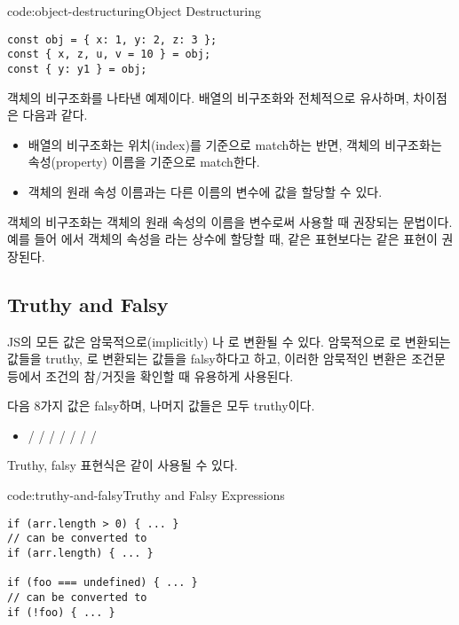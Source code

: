 \begin{codeenv}{code:object-destructuring}{Object Destructuring}\begin{verbatim}
const obj = { x: 1, y: 2, z: 3 };
const { x, z, u, v = 10 } = obj;
const { y: y1 } = obj;
\end{verbatim}
\end{codeenv}

\은 객체의 비구조화를 나타낸 예제이다. 배열의 비구조화와 전체적으로 유사하며, 차이점은 다음과 같다.

\begin{itemize}
    \item 배열의 비구조화는 위치(index)를 기준으로 match하는 반면, 객체의 비구조화는 속성(property) 이름을 기준으로 match한다.
    \item 객체의 원래 속성 이름과는 다른 이름의 변수에 값을 할당할 수 있다.
\end{itemize}

객체의 비구조화는 객체의 원래 속성의 이름을 변수로써 사용할 때 권장되는 문법이다. 예를 들어 에서  객체의  속성을 라는 상수에 할당할 때,  같은 표현보다는  같은 표현이 권장된다.
\newpage

\subsection*{Truthy and Falsy}

JS의 모든 값은 암묵적으로(implicitly) 나 로 변환될 수 있다. 암묵적으로 로 변환되는 값들을 truthy, 로 변환되는 값들을 falsy하다고 하고, 이러한 암묵적인 변환은 조건문 등에서 조건의 참/거짓을 확인할 때 유용하게 사용된다.

다음 8가지 값은 falsy하며, 나머지 값들은 모두 truthy이다.

\begin{itemize}
    \item {} /  /  /  /  /  /  / 
\end{itemize}

Truthy, falsy 표현식은 \와 같이 사용될 수 있다.

\begin{codeenv}{code:truthy-and-falsy}{Truthy and Falsy Expressions}\begin{verbatim}
if (arr.length > 0) { ... }
// can be converted to
if (arr.length) { ... }

if (foo === undefined) { ... }
// can be converted to
if (!foo) { ... }
\end{verbatim}
\end{codeenv}

